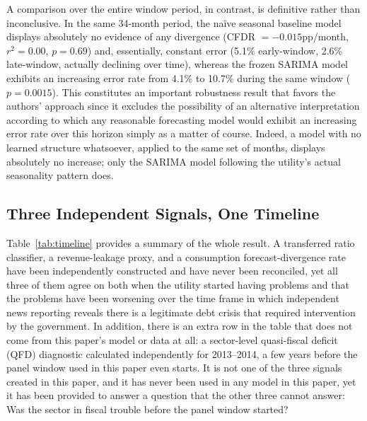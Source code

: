 \documentclass[final,1p,times]{elsarticle}
\begin{document}
A comparison over the entire window period, in contrast, is definitive rather than inconclusive. In the same 34-month period, the naïve seasonal baseline model displays absolutely no evidence of any divergence (CFDR $= -0.015$pp/month, $r^2 = 0.00$, $p = 0.69$) and, essentially, constant error (5.1\% early-window, 2.6\% late-window, actually declining over time), whereas the frozen SARIMA model exhibits an increasing error rate from 4.1\% to 10.7\% during the same window ($p = 0.0015$). This constitutes an important robustness result that favors the authors' approach since it excludes the possibility of an alternative interpretation according to which any reasonable forecasting model would exhibit an increasing error rate over this horizon simply as a matter of course. Indeed, a model with no learned structure whatsoever, applied to the same set of months, displays absolutely no increase; only the SARIMA model following the utility's actual seasonality pattern does.

\subsection{Three Independent Signals, One Timeline}

Table~\ref{tab:timeline} provides a summary of the whole result. A transferred ratio classifier, a revenue-leakage proxy, and a consumption forecast-divergence rate have been independently constructed and have never been reconciled, yet all three of them agree on both when the utility started having problems and that the problems have been worsening over the time frame in which independent news reporting reveals there is a legitimate debt crisis that required intervention by the government. In addition, there is an extra row in the table that does not come from this paper's model or data at all: a sector-level quasi-fiscal deficit (QFD) diagnostic calculated independently for 2013--2014, a few years before the panel window used in this paper even starts. It is not one of the three signals created in this paper, and it has never been used in any model in this paper, yet it has been provided to answer a question that the other three cannot answer: Was the sector in fiscal trouble before the panel window started?
\end{document}
